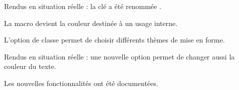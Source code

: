 \begin{tdocbreak}
    \item Rendus en situation réelle : la clé  a été renommée .

    \item La macro  devient la couleur  destinée à un usage interne.
\end{tdocbreak}


\begin{tdocnew}
    \item L'option de classe  permet de choisir différents thèmes de mise en forme.

    \item Rendus en situation réelle : une nouvelle option  permet de changer aussi la couleur du texte.

    \item Les nouvelles fonctionnalités ont été documentées.
\end{tdocnew}